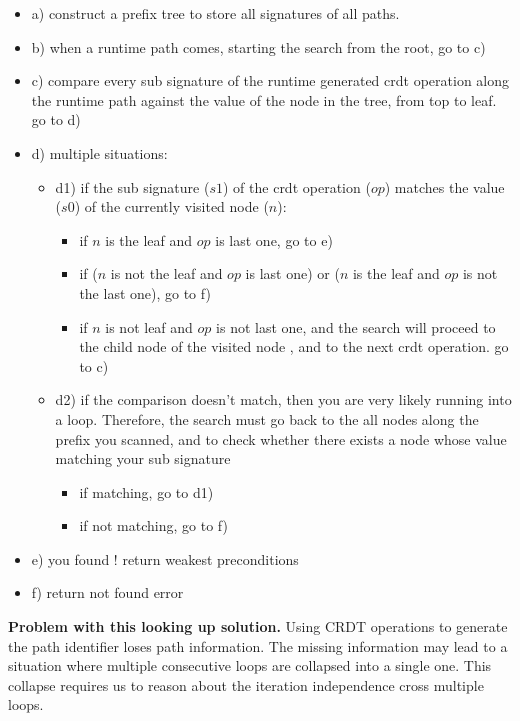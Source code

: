 \begin{itemize}
\item a) construct a prefix tree to store all signatures of all paths.
\item b) when a runtime path comes, starting the search from the root, go to c)
\item c) compare every sub signature of the runtime generated crdt operation along the runtime path against the value of the node in the tree, from top to leaf. go to d)
\item d) multiple situations:
   \begin{itemize}
     \item d1) if the sub signature ($s1$) of the crdt operation ($op$) matches the value ($s0$) of the currently visited node ($n$):
        \begin{itemize}
	\item if $n$ is the leaf and $op$ is last one, go to e)
        \item if ($n$ is not the leaf and $op$ is last one)  or ($n$ is the leaf and $op$ is not the last one), go to f)
        \item if $n$ is not leaf and $op$ is not last one, and the search will proceed to the child node of the visited node , and to the next crdt operation. go to c)
	\end{itemize}
     \item d2) if the comparison doesn't match, then you are very likely running into a loop. Therefore, the search must go back to the all nodes along the prefix you scanned, and to check whether there exists a node whose value matching your sub signature
	\begin{itemize}
        \item if matching, go to d1)
        \item if not matching, go to f)
	\end{itemize}
    \end{itemize}
\item e) you found ! return weakest preconditions
\item f) return not found error  
\end{itemize}

{\bf Problem with this looking up solution.} Using CRDT operations
to generate the path identifier loses path information. The missing information
may lead to a situation where multiple consecutive loops are collapsed into a single one.
This collapse requires us to reason about the iteration independence cross
multiple loops. 

